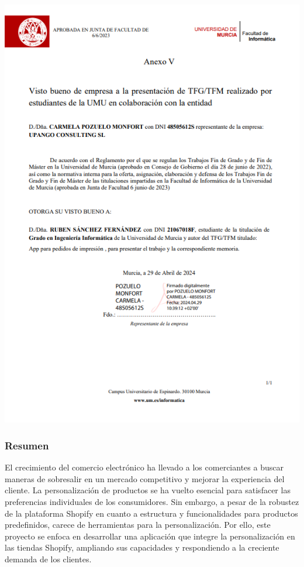 \documentclass[11pt]{article}
\begin{document}
\pagestyle{empty}
\setcounter{page}{1}
\part*{}
\tableofcontents
\newpage
\listoffigures
\listoftables
\newpage
\clearpage
\pagestyle{fancy}

% 
\includegraphics[width=1\textwidth]{Anexo_Firmado_Upango.png}

\clearpage
\section{Resumen}
El crecimiento del comercio electrónico ha llevado a los comerciantes a buscar maneras de sobresalir en un mercado competitivo y mejorar 
la experiencia del cliente. La personalización de productos se ha vuelto esencial para satisfacer las preferencias individuales de los consumidores. 
Sin embargo, a pesar de la robustez de la plataforma Shopify en cuanto a estructura y funcionalidades para productos predefinidos, carece de herramientas 
para la personalización. Por ello, este proyecto se enfoca en desarrollar una aplicación que integre la personalización en las tiendas Shopify, 
ampliando sus capacidades y respondiendo a la creciente demanda de los clientes.
\end{document}
